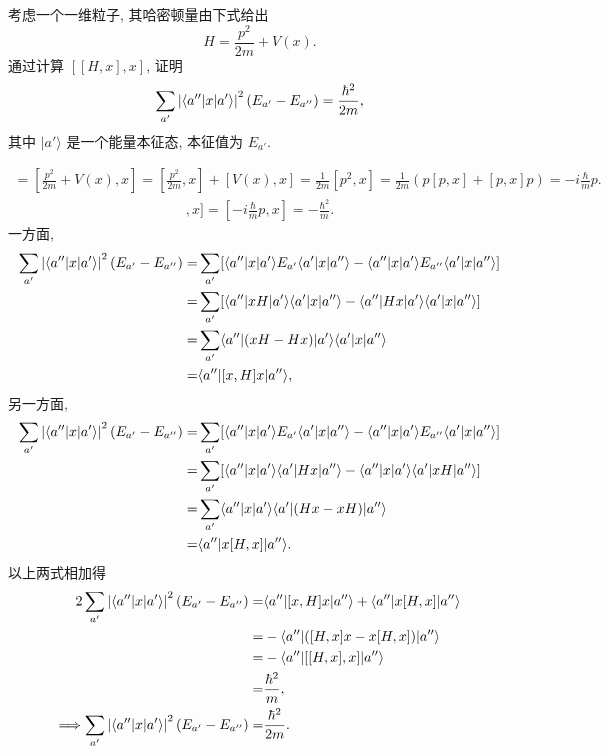 \documentclass{assignment}
\begin{document}
\begin{prob}[课本习题 2.6]
    考虑一个一维粒子, 其哈密顿量由下式给出
    \[
        H=\frac{p^2}{2m}+V(x).
    \]
    通过计算 $[[H,x],x]$, 证明
    \[
        \sum_{a'}\left\lvert\langle a''\rvert x\lvert a'\rangle\right\rvert^2(E_{a'}-E_{a''})=\frac{\hbar^2}{2m},
    \]
    其中 $\lvert a'\rangle$ 是一个能量本征态, 本征值为 $E_{a'}$.
\end{prob}
\begin{pf}
    \begin{align}
        [H,x]=[\frac{p^2}{2m}+V(x),x]=[\frac{p^2}{2m},x]+[V(x),x]=\frac{1}{2m}[p^2,x]=\frac{1}{2m}(p[p,x]+[p,x]p)=-i\frac{\hbar}{m}p.
    \end{align}
    \begin{align}
        [[H,x],x]=[-i\frac{\hbar}{m}p,x]=-\frac{\hbar^2}{m}.
    \end{align}
    一方面,
    \begin{align}
        \notag\sum_{a'}\left\lvert\langle a''\rvert x\lvert a'\rangle\right\rvert^2(E_{a'}-E_{a''})=&\sum_{a'}[\langle a''\rvert x\lvert a'\rangle E_{a'}\langle a'\rvert x\lvert a''\rangle-\langle a''\rvert x\lvert a'\rangle E_{a''}\langle a'\rvert x\lvert a''\rangle]\\
        \notag=&\sum_{a'}[\langle a''\rvert xH\lvert a'\rangle\langle a'\rvert x\lvert a''\rangle-\langle a''\rvert Hx\lvert a'\rangle\langle a'\rvert x\lvert a''\rangle]\\
        \notag=&\sum_{a'}\langle a''\rvert(xH-Hx)\lvert a'\rangle\langle a'\rvert x\lvert a''\rangle\\
        =&\langle a''\rvert[x,H]x\lvert a''\rangle,
    \end{align}
    另一方面,
    \begin{align}
        \notag\sum_{a'}\left\lvert\langle a''\rvert x\lvert a'\rangle\right\rvert^2(E_{a'}-E_{a''})=&\sum_{a'}[\langle a''\rvert x\lvert a'\rangle E_{a'}\langle a'\rvert x\lvert a''\rangle-\langle a''\rvert x\lvert a'\rangle E_{a''}\langle a'\rvert x\lvert a''\rangle]\\
        \notag=&\sum_{a'}[\langle a''\rvert x\lvert a'\rangle\langle a'\rvert Hx\lvert a''\rangle-\langle a''\rvert x\lvert a'\rangle\langle a'\rvert xH\lvert a''\rangle]\\
        \notag=&\sum_{a'}\langle a''\rvert x\lvert a'\rangle\langle a'\rvert(Hx-xH)\lvert a''\rangle\\
        =&\langle a''\rvert x[H,x]\lvert a''\rangle.
    \end{align}
    以上两式相加得
    \begin{align}
        \notag 2\sum_{a'}\left\lvert\langle a''\rvert x\lvert a'\rangle\right\rvert^2(E_{a'}-E_{a''})=&\langle a''\rvert[x,H]x\lvert a''\rangle+\langle a''\rvert x[H,x]\lvert a''\rangle\\
        \notag=&-\langle a''\rvert([H,x]x-x[H,x])\lvert a''\rangle\\
        \notag=&-\langle a''\rvert[[H,x],x]\lvert a''\rangle\\
        =&\frac{\hbar^2}{m},\\
        \Longrightarrow\sum_{a'}\left\lvert\langle a''\rvert x\lvert a'\rangle\right\rvert^2(E_{a'}-E_{a''})=&\frac{\hbar^2}{2m}.
    \end{align}
\end{pf}
\end{document}
